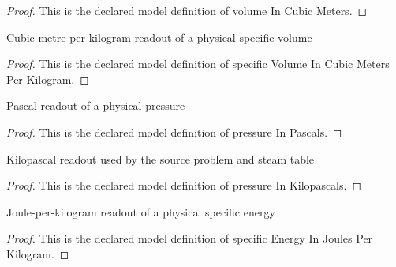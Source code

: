 \begin{proof}
  This is the declared model definition of volume In Cubic Meters.
\end{proof}
\begin{definition}
  \label{def:physics:phyx-mini-0452:phyxminiproblems-problemphyxmini0452-specificvolumeincubicmetersperkilogram}
  Cubic-metre-per-kilogram readout of a physical specific volume
\end{definition}
\begin{proof}
  This is the declared model definition of specific Volume In Cubic Meters Per Kilogram.
\end{proof}
\begin{definition}
  \label{def:physics:phyx-mini-0452:phyxminiproblems-problemphyxmini0452-pressureinpascals}
  Pascal readout of a physical pressure
\end{definition}
\begin{proof}
  This is the declared model definition of pressure In Pascals.
\end{proof}
\begin{definition}
  \label{def:physics:phyx-mini-0452:phyxminiproblems-problemphyxmini0452-pressureinkilopascals}
  Kilopascal readout used by the source problem and steam table
\end{definition}
\begin{proof}
  This is the declared model definition of pressure In Kilopascals.
\end{proof}
\begin{definition}
  \label{def:physics:phyx-mini-0452:phyxminiproblems-problemphyxmini0452-specificenergyinjoulesperkilogram}
  Joule-per-kilogram readout of a physical specific energy
\end{definition}
\begin{proof}
  This is the declared model definition of specific Energy In Joules Per Kilogram.
\end{proof}
